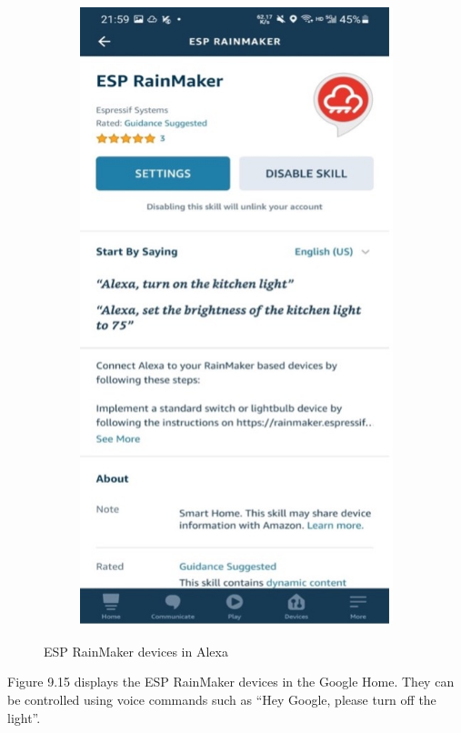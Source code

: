 \documentclass[a4paper,12pt,openany]{book}
\begin{document}
\begin{figure}[h!]
\begin{subfigure}{0.4\textwidth}
        \includegraphics[height=1.3\textwidth,frame]{D9Z/9-14b}
    \end{subfigure}
    \caption{ESP RainMaker devices in Alexa}
\end{figure}

Figure 9.15 displays the ESP RainMaker devices in the Google Home. They can be controlled using voice commands such as “Hey Google, please turn off the light”.
\end{document}
